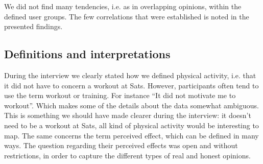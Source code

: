 We did not find many tendencies, i.e. as in overlapping opinions, within the defined user groups. The few correlations that were established is noted in the presented findings. 


\subsection{Definitions and interpretations }
During the interview we clearly stated how we defined physical activity, i.e. that it did not have to concern a workout at Sats. However, participants often tend to use the term workout or training. For instance “It did not motivate me to workout”. Which makes some of the details about the data somewhat ambiguous. This is something we should have made clearer during the interview: it doesn't need to be a workout at Sats, all kind of physical activity would be interesting to map. The same concerns the term perceived effect, which can be defined in many ways. The question regarding their perceived effects was open and without restrictions, in order to capture the different types of real and honest opinions.


